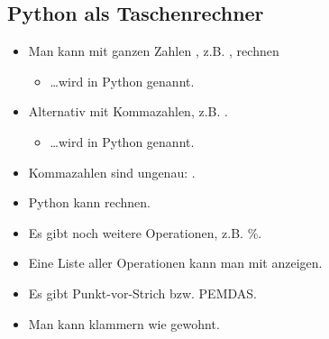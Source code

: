 \subsection{Python als Taschenrechner}
\begin{frame}
    \slidehead
    \begin{itemize}[<+->]
        \item Man kann mit ganzen Zahlen , z.B. , rechnen
            \begin{itemize}
                \item \dots wird in Python  genannt.
            \end{itemize}
        \item Alternativ mit Kommazahlen, z.B. .
            \begin{itemize}
                \item \dots wird in Python  genannt.
            \end{itemize}
        \item Kommazahlen sind ungenau: .
        \item Python kann \pythoninline{+, -, *, /} rechnen.
        \item Es gibt noch weitere Operationen, z.B. \pythoninline{**, //,} {\color{gray} \%}.
        \item Eine Liste aller Operationen kann man mit  anzeigen.
        \item Es gibt Punkt-vor-Strich bzw. PEMDAS.
        \item Man kann klammern \pythoninline{()} wie gewohnt.
    \end{itemize}
\end{frame}

